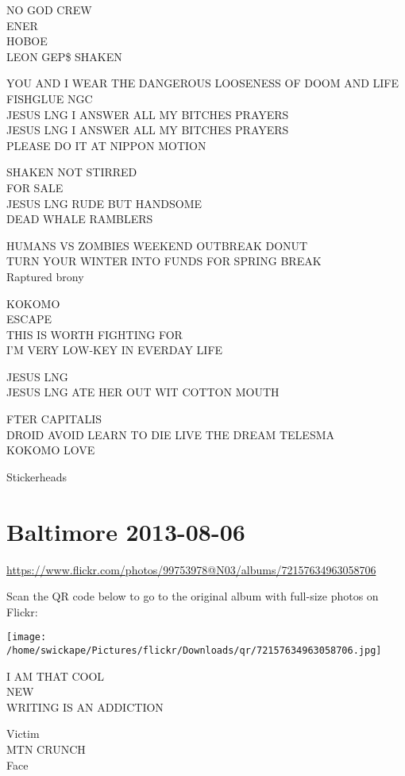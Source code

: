 \documentclass[10pt,letterpaper]{article}
\begin{document}
NO GOD CREW\\
ENER\\
HOBOE\\
LEON GEP\$ SHAKEN

YOU AND I WEAR THE DANGEROUS LOOSENESS OF DOOM AND LIFE FISHGLUE NGC\\
JESUS LNG I ANSWER ALL MY BITCHES PRAYERS\\
JESUS LNG I ANSWER ALL MY BITCHES PRAYERS\\
PLEASE DO IT AT NIPPON MOTION

SHAKEN NOT STIRRED\\
FOR SALE\\
JESUS LNG RUDE BUT HANDSOME\\
DEAD WHALE RAMBLERS

HUMANS VS ZOMBIES WEEKEND OUTBREAK DONUT\\
TURN YOUR WINTER INTO FUNDS FOR SPRING BREAK\\
Raptured brony

KOKOMO\\
ESCAPE\\
THIS IS WORTH FIGHTING FOR\\
I'M VERY LOW{-}KEY IN EVERDAY LIFE

JESUS LNG\\
JESUS LNG ATE HER OUT WIT COTTON MOUTH

FTER CAPITALIS\\
DROID AVOID LEARN TO DIE LIVE THE DREAM TELESMA\\
KOKOMO LOVE

Stickerheads
\pagebreak

\section*{Baltimore 2013-08-06}

\url{https://www.flickr.com/photos/99753978@N03/albums/72157634963058706}

Scan the QR code below to go to the original album with full-size photos on Flickr:

\texttt{[image: /home/swickape/Pictures/flickr/Downloads/qr/72157634963058706.jpg]}
\pagebreak

I AM THAT COOL\\
NEW\\
WRITING IS AN ADDICTION

Victim\\
MTN CRUNCH\\
Face
\end{document}
